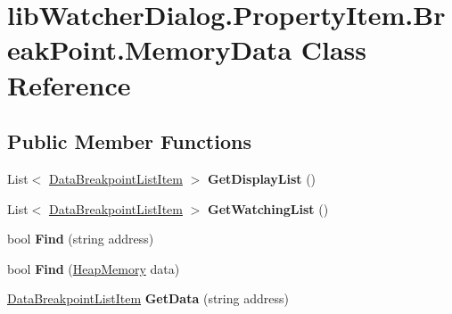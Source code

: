 \hypertarget{classlib_watcher_dialog_1_1_property_item_1_1_break_point_1_1_memory_data}{\section{lib\+Watcher\+Dialog.\+Property\+Item.\+Break\+Point.\+Memory\+Data Class Reference}
\label{classlib_watcher_dialog_1_1_property_item_1_1_break_point_1_1_memory_data}
}
\subsection*{Public Member Functions}
\begin{DoxyCompactItemize}
\item 
\hypertarget{classlib_watcher_dialog_1_1_property_item_1_1_break_point_1_1_memory_data_a1806b842d5ebe7959f63dbd76b226008}{List$<$ \hyperlink{classlib_watcher_dialog_1_1_list_1_1_data_breakpoint_list_item}{Data\+Breakpoint\+List\+Item} $>$ {\bfseries Get\+Display\+List} ()}\label{classlib_watcher_dialog_1_1_property_item_1_1_break_point_1_1_memory_data_a1806b842d5ebe7959f63dbd76b226008}

\item 
\hypertarget{classlib_watcher_dialog_1_1_property_item_1_1_break_point_1_1_memory_data_a0d49aced62a4ba65ef1fc8b051d9c2a7}{List$<$ \hyperlink{classlib_watcher_dialog_1_1_list_1_1_data_breakpoint_list_item}{Data\+Breakpoint\+List\+Item} $>$ {\bfseries Get\+Watching\+List} ()}\label{classlib_watcher_dialog_1_1_property_item_1_1_break_point_1_1_memory_data_a0d49aced62a4ba65ef1fc8b051d9c2a7}

\item 
\hypertarget{classlib_watcher_dialog_1_1_property_item_1_1_break_point_1_1_memory_data_af1387ad3ae322c627f19f80504e37ff4}{bool {\bfseries Find} (string address)}\label{classlib_watcher_dialog_1_1_property_item_1_1_break_point_1_1_memory_data_af1387ad3ae322c627f19f80504e37ff4}

\item 
\hypertarget{classlib_watcher_dialog_1_1_property_item_1_1_break_point_1_1_memory_data_aa512e762ddf4850a0fa783271df43b69}{bool {\bfseries Find} (\hyperlink{classlib_wather_debugger_1_1_memory_1_1_heap_memory}{Heap\+Memory} data)}\label{classlib_watcher_dialog_1_1_property_item_1_1_break_point_1_1_memory_data_aa512e762ddf4850a0fa783271df43b69}

\item 
\hypertarget{classlib_watcher_dialog_1_1_property_item_1_1_break_point_1_1_memory_data_a0dbe39374da868bf6630deb2a569da0e}{\hyperlink{classlib_watcher_dialog_1_1_list_1_1_data_breakpoint_list_item}{Data\+Breakpoint\+List\+Item} {\bfseries Get\+Data} (string address)}\label{classlib_watcher_dialog_1_1_property_item_1_1_break_point_1_1_memory_data_a0dbe39374da868bf6630deb2a569da0e}


\end{DoxyCompactItemize}
